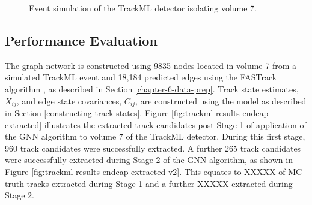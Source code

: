 \begin{figure}[htbp!] 
    \centering
    \hfill%
    \caption{Event simulation of the TrackML detector isolating volume 7.}
    \label{fig:trackml-results-endcap-nodes-sim}
\end{figure}



\subsection{Performance Evaluation}

The graph network is constructed using 9835 nodes located in volume 7 from a simulated TrackML event and 18,184 predicted edges using the FASTrack algorithm \cite{Dmitry-fasttrack-addtest}, as described in Section \ref{chapter-6-data-prep}. Track state estimates, $X_{ij}$, and edge state covariances, $C_{ij}$, are constructed using the model as described in Section \ref{constructing-track-states}. Figure \ref{fig:trackml-results-endcap-extracted} illustrates the extracted track candidates post Stage 1 of application of the GNN algorithm to volume 7 of the TrackML detector. During this first stage, 960 track candidates were successfully extracted. A further 265 track candidates were successfully extracted during Stage 2 of the GNN algorithm, as shown in Figure \ref{fig:trackml-results-endcap-extracted-v2}. This equates to XXXXX of MC truth tracks extracted during Stage 1 and a further XXXXX extracted during Stage 2.

